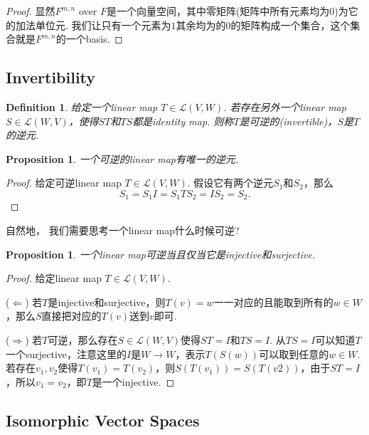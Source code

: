 \documentclass{article}
\newtheorem{proposition}[theorem]{Proposition}
\newtheorem{definition}[theorem]{Definition}
\begin{document}
\begin{proof}
显然$F^{m,n}$ over $F$是一个向量空间，其中零矩阵(矩阵中所有元素均为0)为它的加法单位元. 我们让只有一个元素为$1$其余均为的$0$的矩阵构成一个集合，这个集合就是$F^{m,n}$的一个basis.
\end{proof}

\newpage
\subsection{Invertibility}

\begin{definition}
\rm 给定一个linear map $T \in \mathcal{L}(V,W)$. 若存在另外一个linear map $S \in \mathcal{L}(W,V)$，使得$ST$和$TS$都是identity map. 则称$T$是可逆的(invertible)，$S$是$T$的逆元.
\end{definition}

\begin{proposition}
\rm 一个可逆的linear map有唯一的逆元.
\end{proposition}

\begin{proof}
\rm 给定可逆linear map $T \in \mathcal{L}(V,W)$. 假设它有两个逆元$S_1$和$S_2$，那么
$$
S_1 = S_1I = S_1TS_2 = IS_2 =S_2.
$$
\end{proof}

自然地，{\color{red} 我们需要思考一个linear map什么时候可逆}?

\begin{proposition}\label{iso: cond}
\rm 一个linear map可逆当且仅当它是injective和surjective.
\end{proposition}


\begin{proof}
给定linear map $T \in \mathcal{L}(V,W)$. 

($\Leftarrow$)  若$T$是injective和surjective，则$T(v) = w$一一对应的且能取到所有的$w \in W$，那么$S$直接把对应的$T(v)$送到$v$即可.

($\Rightarrow$) 若$T$可逆，那么存在$S \in \mathcal{L}(W,V)$使得$ST = I$和$TS = I$. 从$TS = I$可以知道$T$一个surjective，注意这里的$I$是$W \rightarrow W$，表示$T(S(w))$可以取到任意的$w \in W$. 若存在$v_1,v_2$使得$T(v_1) = T(v_2)$，则$S(T(v_1)) = S(T(v2))$，由于$ST = I$，所以$v_1 = v_2$，即$T$是一个injective. 
\end{proof}

\newpage
\subsection{Isomorphic Vector Spaces}
\end{document}

